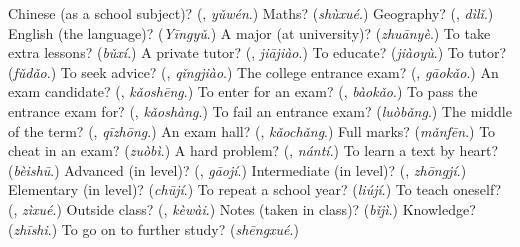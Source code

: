 \begin{tcolorbox}[breakable,colback=teal!4,colframe=teal!35!black,title={Before you move on}]
Chinese (as a school subject)? (\textbf{}, \emph{yǔwén}.) Maths? (\emph{shùxué}.) Geography? (\textbf{}, \emph{dìlǐ}.) English (the language)? (\emph{Yīngyǔ}.) A major (at university)? (\emph{zhuānyè}.) To take extra lessons? (\emph{bǔxí}.) A private tutor? (\textbf{}, \emph{jiājiào}.) To educate? (\emph{jiàoyù}.) To tutor? (\emph{fǔdǎo}.) To seek advice? (\textbf{}, \emph{qǐngjiào}.) The college entrance exam? (\textbf{}, \emph{gāokǎo}.) An exam candidate? (\textbf{}, \emph{kǎoshēng}.) To enter for an exam? (\textbf{}, \emph{bàokǎo}.) To pass the entrance exam for? (\textbf{}, \emph{kǎoshàng}.) To fail an entrance exam? (\emph{luòbǎng}.) The middle of the term? (\textbf{}, \emph{qīzhōng}.) An exam hall? (\textbf{}, \emph{kǎochǎng}.) Full marks? (\emph{mǎnfēn}.) To cheat in an exam? (\emph{zuòbì}.) A hard problem? (\textbf{}, \emph{nántí}.) To learn a text by heart? (\emph{bèishū}.) Advanced (in level)? (\textbf{}, \emph{gāojí}.) Intermediate (in level)? (\textbf{}, \emph{zhōngjí}.) Elementary (in level)? (\emph{chūjí}.) To repeat a school year? (\emph{liújí}.) To teach oneself? (\textbf{}, \emph{zìxué}.) Outside class? (\textbf{}, \emph{kèwài}.) Notes (taken in class)? (\emph{bǐjì}.) Knowledge? (\emph{zhīshi}.) To go on to further study? (\emph{shēngxué}.)
\end{tcolorbox}

